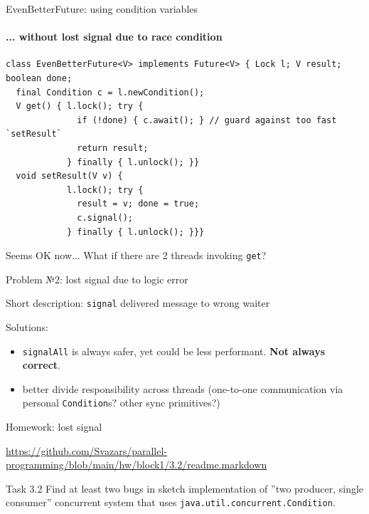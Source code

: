 \begin{frame}[t,fragile]{EvenBetterFuture: using condition variables}
\framesubtitle{... without lost signal due to race condition}

\begin{verbatim}
class EvenBetterFuture<V> implements Future<V> { Lock l; V result; boolean done;
  final Condition c = l.newCondition();
  V get() { l.lock(); try {
              if (!done) { c.await(); } // guard against too fast `setResult`
              return result; 
            } finally { l.unlock(); }}
  void setResult(V v) { 
            l.lock(); try { 
              result = v; done = true;
              c.signal();
            } finally { l.unlock(); }}}
\end{verbatim}

\pause Seems OK now... \pause What if there are 2 threads invoking \texttt{get}?
\end{frame}

\begin{frame}{Problem №2: lost signal due to logic error}

Short description: \texttt{signal} delivered message to wrong waiter

\pause

Solutions:
\begin{itemize}
    \pause \item \texttt{signalAll} is always safer, yet could be less performant. \textbf{Not always correct}.
    \pause \item better divide responsibility across threads (one-to-one communication via personal \texttt{Condition}s? other sync primitives?)
\end{itemize}
\end{frame}

\begin{frame}[t,fragile]{Homework: lost signal}

{\tiny\url{https://github.com/Svazars/parallel-programming/blob/main/hw/block1/3.2/readme.markdown}}
\begin{homeworkmail}{Task 3.2}
    Find at least two bugs in sketch implementation of ''two producer, single consumer'' concurrent system that uses \texttt{java.util.concurrent.Condition}.
\end{homeworkmail}
\end{frame}

